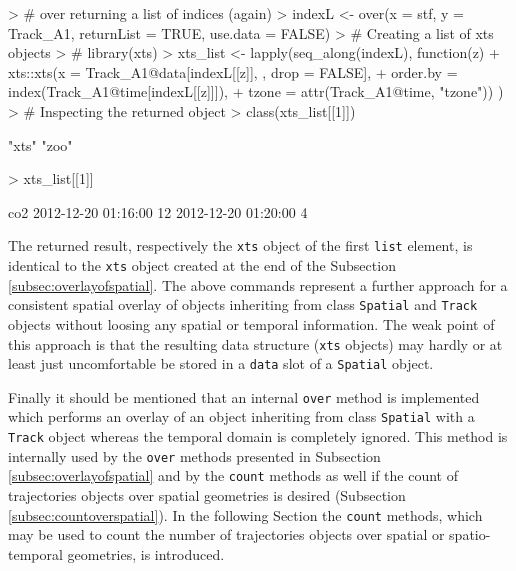 \documentclass[12pt, oneside, a4paper]{scrbook}
\newcommand{\pkg}[1]{{\normalfont\fontseries{b}\selectfont #1}}
\let\code=\texttt
\begin{document}
\begin{small}
\begin{Schunk}
\begin{Sinput}
> # over returning a list of indices (again) 
> indexL <- over(x = stf, y = Track_A1, returnList = TRUE, use.data = FALSE)
> # Creating a list of xts objects
> # library(xts)
> xts_list <- lapply(seq_along(indexL), function(z) {
+   xts::xts(x = Track_A1@data[indexL[[z]], , drop = FALSE], 
+            order.by = index(Track_A1@time[indexL[[z]]]),
+            tzone = attr(Track_A1@time, "tzone")) })
> # Inspecting the returned object
> class(xts_list[[1]])
\end{Sinput}
\begin{Soutput}
[1] "xts" "zoo"
\end{Soutput}
\begin{Sinput}
> xts_list[[1]]
\end{Sinput}
\begin{Soutput}
                    co2
2012-12-20 01:16:00  12
2012-12-20 01:20:00   4
\end{Soutput}
\end{Schunk}
\end{small}

The returned result, respectively the \code{xts} object of the first \code{list} element, is identical to the \code{xts} object created at the end of the Subsection \ref{subsec:overlayofspatial}. 
The above commands represent a further approach for a consistent spatial overlay of objects inheriting from class \code{Spatial} and \code{Track} objects without loosing any spatial or temporal information. The weak point of this approach is that the resulting data structure (\code{xts} objects) may hardly or at least just uncomfortable be stored in a \code{data} slot of a \code{Spatial} object.

\par\medskip

Finally it should be mentioned that an internal \code{over} method is implemented which performs an overlay of an object inheriting from class \code{Spatial} with a \code{Track} object whereas the temporal domain is completely ignored. 
This method is internally used by the \code{over} methods presented in Subsection~ \ref{subsec:overlayofspatial} and by the \code{count} methods as well if the count of \pkg{trajectories} objects over spatial geometries is desired (Subsection \ref{subsec:countoverspatial}).
In the following Section the \code{count} methods, which may be used to count the number of \pkg{trajectories} objects over spatial or spatio-temporal geometries, is introduced.
\end{document}
